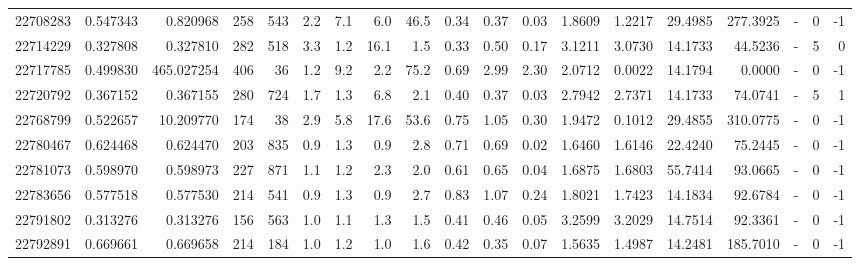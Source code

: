 \begin{tabular}{rrrrrrrrrrrrrrrrlrr}
  22708283 & 0.547343 &   0.820968 &  258 &  543 &      2.2 &      7.1 &     6.0 &     46.5 &       0.34 &        0.37 &        0.03 &  1.8609 &  1.2217 &   29.4985 &  277.3925 &             - &        0 &         -1 \\
  22714229 & 0.327808 &   0.327810 &  282 &  518 &      3.3 &      1.2 &    16.1 &      1.5 &       0.33 &        0.50 &        0.17 &  3.1211 &  3.0730 &   14.1733 &   44.5236 &             - &        5 &          0 \\
  22717785 & 0.499830 & 465.027254 &  406 &   36 &      1.2 &      9.2 &     2.2 &     75.2 &       0.69 &        2.99 &        2.30 &  2.0712 &  0.0022 &   14.1794 &    0.0000 &             - &        0 &         -1 \\
  22720792 & 0.367152 &   0.367155 &  280 &  724 &      1.7 &      1.3 &     6.8 &      2.1 &       0.40 &        0.37 &        0.03 &  2.7942 &  2.7371 &   14.1733 &   74.0741 &             - &        5 &          1 \\
  22768799 & 0.522657 &  10.209770 &  174 &   38 &      2.9 &      5.8 &    17.6 &     53.6 &       0.75 &        1.05 &        0.30 &  1.9472 &  0.1012 &   29.4855 &  310.0775 &             - &        0 &         -1 \\
  22780467 & 0.624468 &   0.624470 &  203 &  835 &      0.9 &      1.3 &     0.9 &      2.8 &       0.71 &        0.69 &        0.02 &  1.6460 &  1.6146 &   22.4240 &   75.2445 &             - &        0 &         -1 \\
  22781073 & 0.598970 &   0.598973 &  227 &  871 &      1.1 &      1.2 &     2.3 &      2.0 &       0.61 &        0.65 &        0.04 &  1.6875 &  1.6803 &   55.7414 &   93.0665 &             - &        0 &         -1 \\
  22783656 & 0.577518 &   0.577530 &  214 &  541 &      0.9 &      1.3 &     0.9 &      2.7 &       0.83 &        1.07 &        0.24 &  1.8021 &  1.7423 &   14.1834 &   92.6784 &             - &        0 &         -1 \\
  22791802 & 0.313276 &   0.313276 &  156 &  563 &      1.0 &      1.1 &     1.3 &      1.5 &       0.41 &        0.46 &        0.05 &  3.2599 &  3.2029 &   14.7514 &   92.3361 &             - &        0 &         -1 \\
  22792891 & 0.669661 &   0.669658 &  214 &  184 &      1.0 &      1.2 &     1.0 &      1.6 &       0.42 &        0.35 &        0.07 &  1.5635 &  1.4987 &   14.2481 &  185.7010 &             - &        0 &         -1 \\

\end{tabular}
